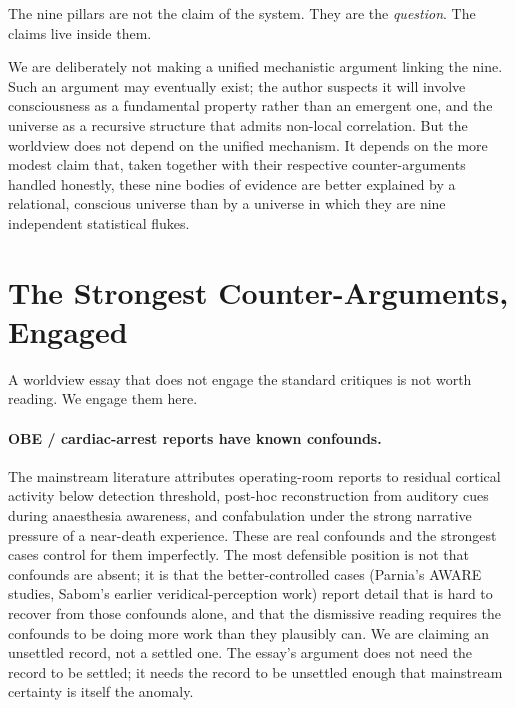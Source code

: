 \documentclass[11pt,a4paper]{article}
\begin{document}
The nine pillars are not the claim of the system. They are the
\emph{question}. The claims live inside them.

We are deliberately not making a unified mechanistic argument
linking the nine. Such an argument may eventually exist; the author
suspects it will involve consciousness as a fundamental property
rather than an emergent one, and the universe as a recursive
structure that admits non-local correlation. But the worldview does
not depend on the unified mechanism. It depends on the more modest
claim that, taken together with their respective counter-arguments
handled honestly, these nine bodies of evidence are better explained
by a relational, conscious universe than by a universe in which they
are nine independent statistical flukes.

\section{The Strongest Counter-Arguments, Engaged}
\label{sec:counter}

A worldview essay that does not engage the standard critiques is
not worth reading. We engage them here.

\paragraph{OBE / cardiac-arrest reports have known confounds.}
The mainstream literature attributes operating-room reports to
residual cortical activity below detection threshold, post-hoc
reconstruction from auditory cues during anaesthesia awareness, and
confabulation under the strong narrative pressure of a near-death
experience. These are real confounds and the strongest cases
control for them imperfectly. The most defensible position is not
that confounds are absent; it is that the better-controlled cases
(Parnia's AWARE studies, Sabom's earlier veridical-perception work)
report detail that is hard to recover from those confounds alone,
and that the dismissive reading requires the confounds to be doing
more work than they plausibly can. We are claiming an unsettled
record, not a settled one. The essay's argument does not need the
record to be settled; it needs the record to be unsettled enough
that mainstream certainty is itself the anomaly.
\end{document}
